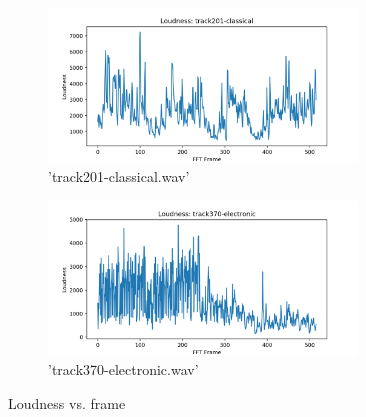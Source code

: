 \documentclass[11pt,a4paper]{article}
\begin{document}
\begin{figure}[tb]
	\centering
	\begin{subfigure}[t]{\hsize}
		\centering
		\includegraphics[width=0.9\textwidth]{loudness_track201-classical}
		\caption{'track201-classical.wav'}
		\label{fig:loudness_classical}
	\end{subfigure}
	\begin{subfigure}[t]{\hsize}
		\centering
		\includegraphics[width=0.9\textwidth]{loudness_track370-electronic}
		\caption{'track370-electronic.wav'}
		\label{fig:loudness_electronic}
	\end{subfigure}
	\caption{Loudness vs. frame \label{fig:loudness}}
\end{figure}
\clearpage
\end{document}
